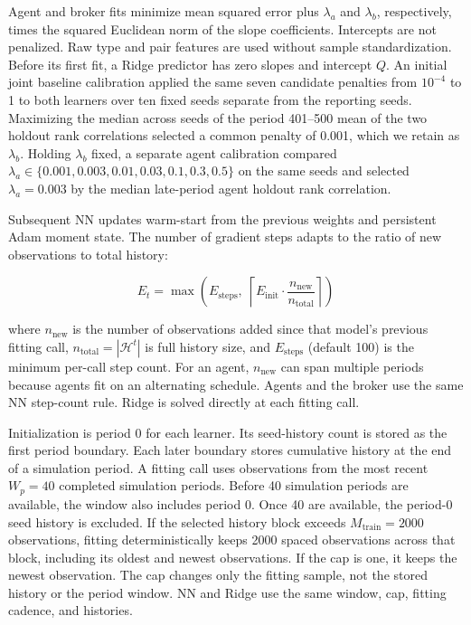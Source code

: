 \documentclass[11pt]{article}
\begin{document}
Agent and broker fits minimize mean squared error plus \(\lambda_a\) and \(\lambda_b\), respectively, times the squared Euclidean norm of the slope coefficients. Intercepts are not penalized. Raw type and pair features are used without sample standardization. Before its first fit, a Ridge predictor has zero slopes and intercept \(Q\). An initial joint baseline calibration applied the same seven candidate penalties from \(10^{-4}\) to 1 to both learners over ten fixed seeds separate from the reporting seeds. Maximizing the median across seeds of the period 401--500 mean of the two holdout rank correlations selected a common penalty of 0.001, which we retain as \(\lambda_b\). Holding \(\lambda_b\) fixed, a separate agent calibration compared \(\lambda_a\in\{0.001,0.003,0.01,0.03,0.1,0.3,0.5\}\) on the same seeds and selected \(\lambda_a=0.003\) by the median late-period agent holdout rank correlation.

Subsequent NN updates warm-start from the previous weights and persistent Adam moment state. The number of gradient steps adapts to the ratio of new observations to total history:

\[E_t = \max\!\left(E_{\text{steps}}, \; \left\lceil E_{\text{init}} \cdot \frac{n_{\text{new}}}{n_{\text{total}}} \right\rceil\right)\]

where \(n_{\text{new}}\) is the number of observations added since that model's previous fitting call, \(n_{\text{total}} = |\mathcal{H}^t|\) is full history size, and \(E_{\text{steps}}\) (default 100) is the minimum per-call step count. For an agent, \(n_{\text{new}}\) can span multiple periods because agents fit on an alternating schedule. Agents and the broker use the same NN step-count rule. Ridge is solved directly at each fitting call.

Initialization is period 0 for each learner. Its seed-history count is stored as the first period boundary. Each later boundary stores cumulative history at the end of a simulation period. A fitting call uses observations from the most recent \(W_p = 40\) completed simulation periods. Before 40 simulation periods are available, the window also includes period 0. Once 40 are available, the period-0 seed history is excluded. If the selected history block exceeds \(M_{\text{train}} = 2000\) observations, fitting deterministically keeps 2000 spaced observations across that block, including its oldest and newest observations. If the cap is one, it keeps the newest observation. The cap changes only the fitting sample, not the stored history or the period window. NN and Ridge use the same window, cap, fitting cadence, and histories.
\end{document}
